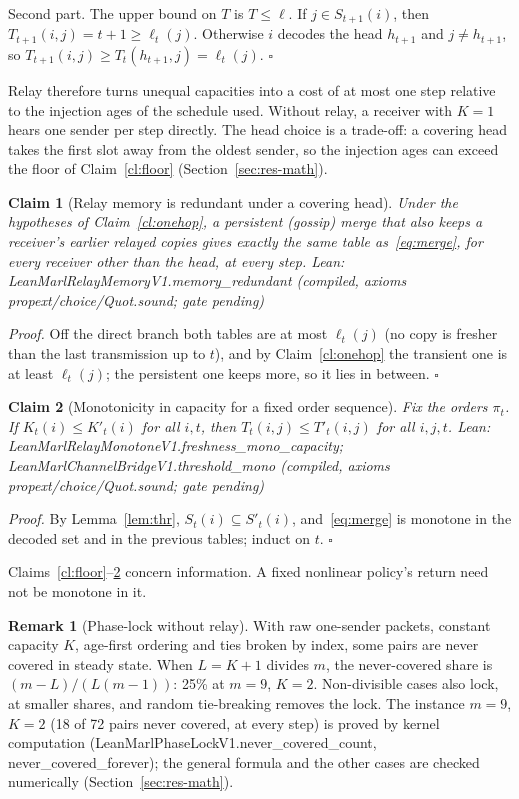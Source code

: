 \documentclass[11pt]{article}
\newtheorem{claim}{Claim}
\theoremstyle{definition}
\newtheorem{remark}{Remark}
\newcommand{\lean}[1]{\textsf{\footnotesize #1}}
\newcommand{\LEANC}[1]{\textsf{\footnotesize Lean: #1 (compiled, axioms propext/choice/Quot.sound; gate pending)}}
\begin{document}
Second part. The upper bound on $T$ is $T\le\ell$. If $j\in S_{t+1}(i)$, then $T_{t+1}(i,j)=t+1\ge\ell_t(j)$. Otherwise $i$
decodes the head $h_{t+1}$ and $j\ne h_{t+1}$, so $T_{t+1}(i,j)\ge T_t(h_{t+1},j)=\ell_t(j)$. $\square$

Relay therefore turns unequal capacities into a cost of at most one step relative to the injection ages of the schedule
used. Without relay, a receiver with $K=1$ hears one sender per step directly. The head choice is a trade-off: a covering
head takes the first slot away from the oldest sender, so the injection ages can exceed the floor of Claim~\ref{cl:floor}
(Section~\ref{sec:res-math}).

\begin{claim}[Relay memory is redundant under a covering head]\label{cl:memory}
Under the hypotheses of Claim~\ref{cl:onehop}, a persistent (gossip) merge that also keeps a receiver's earlier relayed
copies gives exactly the same table as~\eqref{eq:merge}, for every receiver other than the head, at every step.
\LEANC{LeanMarlRelayMemoryV1.memory\_redundant}
\end{claim}
\emph{Proof.} Off the direct branch both tables are at most $\ell_t(j)$ (no copy is fresher than the last transmission up to
$t$), and by Claim~\ref{cl:onehop} the transient one is at least $\ell_t(j)$; the persistent one keeps more, so it lies in
between. $\square$

\begin{claim}[Monotonicity in capacity for a fixed order sequence]\label{cl:mono}
Fix the orders $\pi_t$. If $K_t(i)\le K'_t(i)$ for all $i,t$, then $T_t(i,j)\le T'_t(i,j)$ for all $i,j,t$. \LEANC{LeanMarlRelayMonotoneV1.freshness\_mono\_capacity; LeanMarlChannelBridgeV1.threshold\_mono}
\end{claim}
\emph{Proof.} By Lemma~\ref{lem:thr}, $S_t(i)\subseteq S'_t(i)$, and~\eqref{eq:merge} is monotone in the decoded set and in the
previous tables; induct on $t$. $\square$

Claims~\ref{cl:floor}--\ref{cl:mono} concern information. A fixed nonlinear policy's return need not be monotone in it.

\begin{remark}[Phase-lock without relay]\label{rem:lock}
With raw one-sender packets, constant capacity $K$, age-first ordering and ties broken by index, some pairs are never
covered in steady state. When $L=K+1$ divides $m$, the never-covered share is $(m-L)/(L(m-1))$: 25\% at $m=9$, $K=2$.
Non-divisible cases also lock, at smaller shares, and random tie-breaking removes the lock. The instance $m=9$, $K=2$
(18 of 72 pairs never covered, at every step) is proved by kernel computation
(\lean{LeanMarlPhaseLockV1.never\_covered\_count}, \lean{never\_covered\_forever}); the general formula and the other
cases are checked numerically (Section~\ref{sec:res-math}).
\end{remark}
\end{document}
